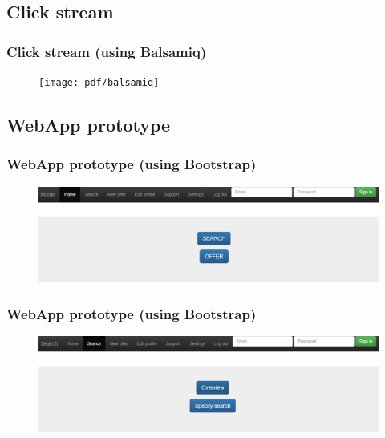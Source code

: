 \documentclass{beamer}
\begin{document}

\subsection{Click stream} %


\begin{frame}
\frametitle{Click stream (using Balsamiq)}
\begin{figure}
\texttt{[image: pdf/balsamiq]}
\end{figure}
\end{frame}


\subsection{WebApp prototype} %


\begin{frame}
\frametitle{WebApp prototype (using Bootstrap)}
\begin{figure}
\includegraphics[width=\textwidth]{png/webapp-start.png}
\end{figure}
\end{frame}


\begin{frame}
\frametitle{WebApp prototype (using Bootstrap)}
\begin{figure}
\includegraphics[width=\textwidth]{png/webapp-search.png}
\end{figure}
\end{frame}
\end{document}
